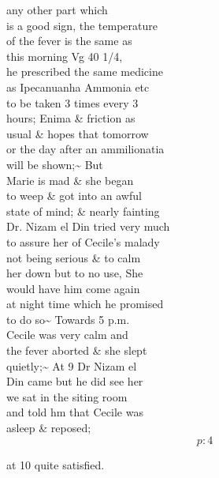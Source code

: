 \documentclass{report}
\begin{document}


	\par{
 	any other part which\ \\is a good sign, the temperature\ \\of the fever is the same as\ \\this morning Vg 40 1/4,\ \\he prescribed the same medicine\ \\as Ipecanuanha Ammonia etc\ \\to be taken 3 times every 3\ \\hours; Enima \& friction as\ \\usual \& hopes that tomorrow\ \\or the day after an ammilionatia\ \\will be shown;\~{} But\ \\Marie is mad \& she began\ \\to weep \& got into an awful\ \\state of mind; \& nearly fainting\ \\Dr. Nizam el Din tried very much\ \\to assure her of Cecile's malady\ \\not being serious \& to calm\ \\her down but to no use, She\ \\would have him come again\ \\at night time which he promised\ \\to do so\~{} Towards 5 p.m.\ \\Cecile was very calm and\ \\the fever aborted \& she slept\ \\quietly;\~{} At 9 Dr Nizam el\ \\Din came but he did see her\ \\we sat in the siting room\ \\and told hm that Cecile was\ \\asleep \& reposed;\ \\
  \[p: 4 \]

	}




	\par{
 	at 10 quite satisfied.\ \\
	}
\end{document}
